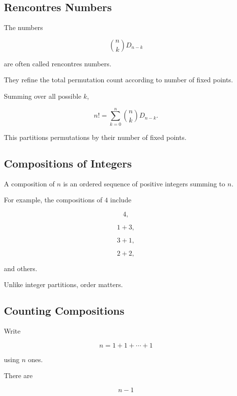 \subsection{Rencontres Numbers}
\label{subsec:rencontres-numbers}

The numbers

\[
\boxed{
\binom{n}{k}D_{n-k}
}
\]

are often called rencontres numbers.

They refine the total permutation count according to number of fixed
points.

Summing over all possible \(k\),

\[
\boxed{
n!
=
\sum_{k=0}^{n}
\binom{n}{k}D_{n-k}.
}
\]

This partitions permutations by their number of fixed points.

\subsection{Compositions of Integers}
\label{subsec:integer-compositions}

A composition of \(n\) is an ordered sequence of positive integers
summing to \(n\).

For example, the compositions of \(4\) include

\[
4,
\]

\[
1+3,
\]

\[
3+1,
\]

\[
2+2,
\]

and others.

Unlike integer partitions, order matters.

\subsection{Counting Compositions}
\label{subsec:counting-compositions}

Write

\[
n
=
1+1+\cdots+1
\]

using \(n\) ones.

There are

\[
n-1
\]

